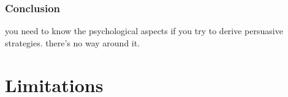



%
%
%
%

\subsubsection{Conclusion}
you need to know the psychological aspects if you try to derive persuasive strategies. there's no way around it. 


\section{Limitations}

